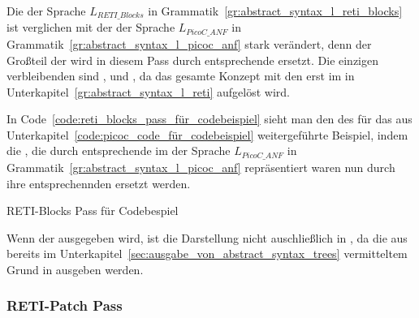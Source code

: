 
Die  der Sprache $L_{RETI\_Blocks}$ in Grammatik~\ref{gr:abstract_syntax_l_reti_blocks} ist verglichen mit der  der Sprache $L_{PicoC\_ANF}$ in Grammatik~\ref{gr:abstract_syntax_l_picoc_anf} stark verändert, denn der Großteil der  wird in diesem Pass durch entsprechende  ersetzt. Die einzigen verbleibenden  sind ,  und , da das gesamte Konzept mit den  erst im  in Unterkapitel~\ref{gr:abstract_syntax_l_reti} aufgelöst wird.

\begin{grammar}
  \toprule
  \retiblocks
  \midrule
  \picocblocksleftover
  \bottomrule
\end{grammar}


In Code~\ref{code:reti_blocks_pass_für_codebeispiel} sieht man den  des  für das aus Unterkapitel~\ref{code:picoc_code_für_codebeispiel} weitergeführte Beispiel, indem die , die durch entsprechende  im  der Sprache $L_{PicoC\_ANF}$ in Grammatik~\ref{gr:abstract_syntax_l_picoc_anf} repräsentiert waren nun durch ihre entsprechennden  ersetzt werden.

\begin{code}
  \centering
  \caption{RETI-Blocks Pass für Codebespiel}
  \label{code:reti_blocks_pass_für_codebeispiel}
\end{code}

\begin{Special_Paragraph}
  Wenn der  ausgegeben wird, ist die Darstellung nicht auschließlich in , da die  aus bereits im Unterkapitel~\ref{sec:ausgabe_von_abstract_syntax_trees} vermitteltem Grund in  ausgeben werden.
\end{Special_Paragraph}

\subsubsection{RETI-Patch Pass}
\label{reti_patch_pass}

